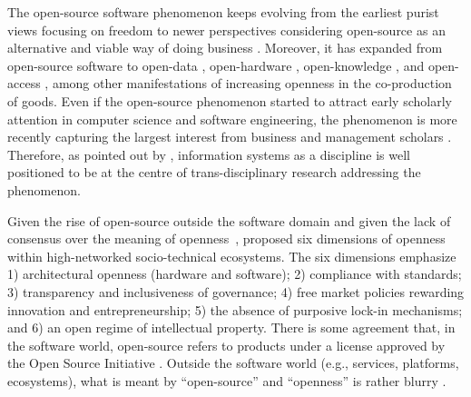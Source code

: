 \documentclass[CHICAGO,Times1COL]{WileyNJDv5} %
\begin{document}
The open-source software phenomenon keeps evolving from the earliest purist views focusing on freedom \citep{stallman_gnu_1985} to newer perspectives considering
open-source as an alternative and viable way of doing business \citep{Fitzgerald2006,TeixeiraMian_et_al2016}. Moreover, it has expanded from open-source software to open-data \citep{gurstein2011open},
open-hardware \citep{maharaj2008low},
open-knowledge \citep{awazu2004open},
and open-access \citep{davis2008open},
among other manifestations of increasing openness in the co-production of goods. Even if the open-source phenomenon started to attract early scholarly attention in computer science and software engineering, the phenomenon is more recently
capturing the largest interest from business and management scholars \citep{raasch_et_al2013_oss_as_interdisciplinary_research}. Therefore, as pointed out by
\citet{carillo_and_bernard2015A_floss_critical_review, vonKrogh_and_spaeth2007characteristic_OS_research},
information systems as a discipline is well positioned to be at the centre of trans-disciplinary research addressing the phenomenon.

Given the rise of open-source outside the software domain and given the lack of consensus over the meaning of openness~\citep{grubb2011lack}, \citet{teixeiraopenness_2015} proposed six dimensions of openness within high-networked socio-technical ecosystems. The six dimensions emphasize 1) architectural openness (hardware and software); 2) compliance with standards; 3) transparency and inclusiveness of governance; 4) free market policies rewarding innovation and entrepreneurship;  5) the absence of purposive lock-in mechanisms; and 6) an open regime of intellectual property. There is some agreement that, in the software world, open-source refers to products  under a license approved by the Open Source Initiative \citep{Fitzgerald2006,lerner2005scope,west2006challenges}. Outside the software world (e.g., services, platforms, ecosystems), what is meant by ``open-source'' and ``openness'' is rather blurry \citep{teixeiraopensym2014}.  
\end{document}

